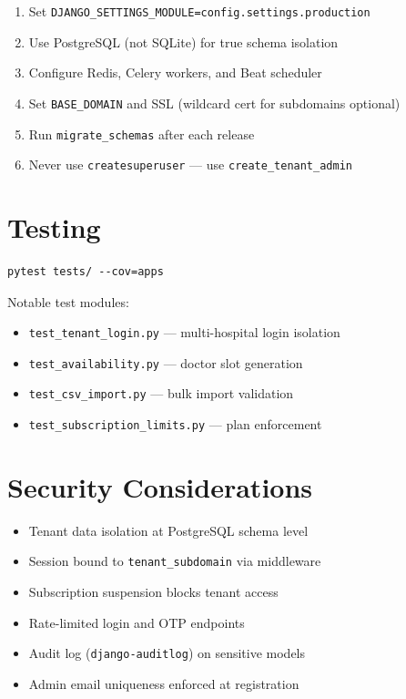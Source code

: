 \documentclass[11pt,a4paper]{report}
\begin{document}
\begin{enumerate}
    \item Set \texttt{DJANGO\_SETTINGS\_MODULE=config.settings.production}
    \item Use PostgreSQL (not SQLite) for true schema isolation
    \item Configure Redis, Celery workers, and Beat scheduler
    \item Set \texttt{BASE\_DOMAIN} and SSL (wildcard cert for subdomains optional)
    \item Run \texttt{migrate\_schemas} after each release
    \item Never use \texttt{createsuperuser} --- use \texttt{create\_tenant\_admin}
\end{enumerate}

\chapter{Testing}

\begin{lstlisting}[style=code]
pytest tests/ --cov=apps
\end{lstlisting}

Notable test modules:
\begin{itemize}[noitemsep]
    \item \texttt{test\_tenant\_login.py} --- multi-hospital login isolation
    \item \texttt{test\_availability.py} --- doctor slot generation
    \item \texttt{test\_csv\_import.py} --- bulk import validation
    \item \texttt{test\_subscription\_limits.py} --- plan enforcement
\end{itemize}

\chapter{Security Considerations}

\begin{itemize}
    \item Tenant data isolation at PostgreSQL schema level
    \item Session bound to \texttt{tenant\_subdomain} via middleware
    \item Subscription suspension blocks tenant access
    \item Rate-limited login and OTP endpoints
    \item Audit log (\texttt{django-auditlog}) on sensitive models
    \item Admin email uniqueness enforced at registration
\end{itemize}
\end{document}

